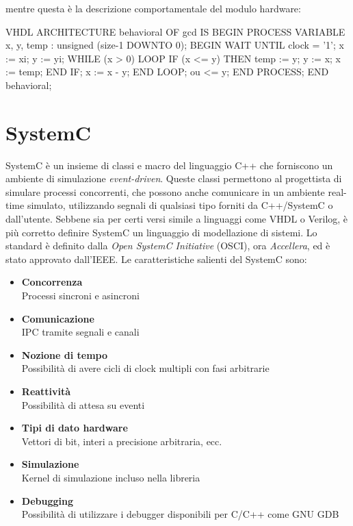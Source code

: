 \documentclass[10pt,a4paper,oneside]{scrbook}
\begin{document}
mentre questa è la descrizione comportamentale del modulo hardware:
\begin{sourcecode}{VHDL}
ARCHITECTURE behavioral OF gcd IS
BEGIN
    PROCESS
        VARIABLE x, y, temp : unsigned (size-1 DOWNTO 0);
    BEGIN
    WAIT UNTIL clock = '1'; 
    x := xi;
    y := yi;
    WHILE (x > 0) LOOP
        IF (x <= y) THEN
            temp := y;
            y := x;
            x := temp;
        END IF;
        x := x - y;
    END LOOP;
    ou <= y;
    END PROCESS;
END behavioral;
\end{sourcecode}

\chapter{SystemC}
SystemC è un insieme di classi e macro del linguaggio C++ che forniscono un ambiente di simulazione \textit{event-driven}.
Queste classi permettono al progettista di simulare processi concorrenti,  che possono anche comunicare in un ambiente
real-time simulato, utilizzando segnali di qualsiasi tipo forniti da C++/SystemC o dall'utente.
Sebbene sia per certi versi simile a linguaggi come VHDL o Verilog, è più corretto definire SystemC un linguaggio di
modellazione di sistemi.
Lo standard è definito dalla \textit{Open SystemC Initiative} (OSCI), ora \textit{Accellera}, ed è stato
approvato dall'IEEE. Le caratteristiche salienti del SystemC sono:
\begin{itemize}
    \item \textbf{Concorrenza}\\
    Processi sincroni e asincroni
    \item \textbf{Comunicazione}\\
    IPC tramite segnali e canali
    \item \textbf{Nozione di tempo}\\
    Possibilità di avere cicli di clock multipli con fasi arbitrarie
    \item \textbf{Reattività}\\
    Possibilità di attesa su eventi
    \item \textbf{Tipi di dato hardware}\\
    Vettori di bit, interi a precisione arbitraria, ecc.
    \item \textbf{Simulazione}\\
    Kernel di simulazione incluso nella libreria
    \item \textbf{Debugging}\\
    Possibilità di utilizzare i debugger disponibili per C/C++ come GNU GDB
\end{itemize}
\end{document}
